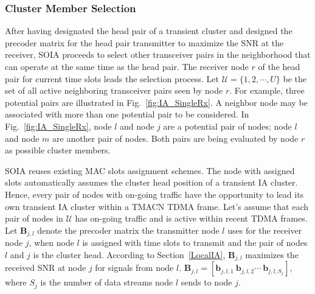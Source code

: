 \documentclass[letterpaper,11pt]{article}
\let\bs\boldsymbol
\begin{document}
\subsubsection{Cluster Member Selection}\label{member_selection}
 
After having designated the head pair of a transient cluster and designed the precoder matrix for the head pair transmitter to maximize the SNR at the receiver, SOIA proceeds to select other transceiver pairs in the neighborhood that can operate at the same time as the head pair. The receiver node $r$ of the head pair for current time slots leads the selection process. Let $\mathcal{U}=\{1, 2, \cdots, U\}$ be the set of all active neighboring transceiver pairs seen by node $r$. For example, three potential pairs are illustrated in Fig.~\ref{fig:IA_SingleRx}. A neighbor node may be associated with more than one potential pair to be considered. In Fig.~\ref{fig:IA_SingleRx}, node $l$ and node $j$ are a potential pair of nodes; node $l$ and node $m$ are another pair of nodes. Both pairs are being evaluated by node $r$ as possible cluster members.

SOIA reuses existing MAC slots assignment schemes. The node with assigned slots automatically assumes the cluster head position of a transient IA cluster. Hence, every pair of nodes with on-going traffic have the opportunity to lead its own transient IA cluster within a TMACN TDMA frame. Let's assume that each pair of nodes in $\mathcal{U}$ has on-going traffic and is active within recent TDMA frames. Let $\mathbf{B}_{j,l}$ denote the precoder matrix the transmitter node $l$ uses for the receiver node $j$, when node $l$ is assigned with time slots to transmit and the pair of nodes $l$ and $j$ is the cluster head. According to Section~\ref{LocalIA}, $\mathbf{B}_{j,l}$ maximizes the received SNR at node $j$ for signals from node $l$. $\mathbf{B}_{j,l}=[\bs{b}_{j,l,1}~\bs{b}_{j,l,2}\cdots~\bs{b}_{j,l,S_{j}}]$, where $S_{j}$ is the number of data streams node $l$ sends to node $j$.  
\end{document}
